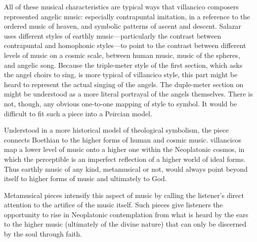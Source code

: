 % 
% 

All of these musical characteristics are typical ways that villancico composers represented angelic music: especially contrapuntal imitation, in a reference to the ordered music of heaven, and symbolic patterns of ascent and descent.
Salazar uses different styles of earthly music---particularly the contrast between contrapuntal and homophonic styles---to point to the contrast between different levels of music on a cosmic scale, between human music, music of the spheres, and angelic song.
Because the triple-meter style of the first section, which asks the angel choirs to sing, is more typical of villancico style, this part might be heard to represent the actual singing of the angels.
The duple-meter section on  might be understood as a more literal portrayal of the angels themselves.
There is not, though, any obvious one-to-one mapping of style to symbol.
It would be difficult to fit such a piece into a Peircian model.

Understood in a more historical model of theological symbolism, the piece connects Boethian  to the higher forms of human and cosmic music. 
 villancicos map a lower level of music onto a higher one within the Neoplatonic cosmos, in which the perceptible  is an imperfect reflection of a higher world of ideal forms.
Thus earthly music of any kind, metamusical or not, would always point beyond itself to higher forms of music and ultimately to God.

Metamusical pieces intensify this aspect of music by calling the listener's direct attention to the artifice of the music itself.
Such pieces give listeners the opportunity to rise in Neoplatonic contemplation from what is heard by the ears to the higher music (ultimately of the divine nature) that can only be discerned by the soul through faith.


